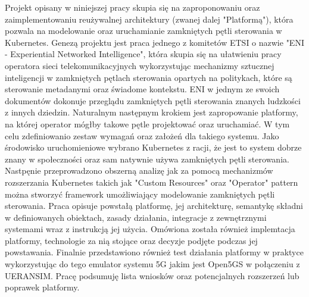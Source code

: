 Projekt opisany w niniejszej pracy skupia się na zaproponowaniu oraz zaimplementowaniu reużywalnej architektury (zwanej dalej "Platformą"), która pozwala na modelowanie oraz uruchamianie zamkniętych pętli sterowania w Kubernetes. Genezą projektu jest praca jednego z komitetów ETSI o nazwie "ENI - Experiential Networked Intelligence", która skupia się na ułatwieniu pracy operatora sieci telekomunikacyjnych wykorzystując mechanizmy sztucznej inteligencji w zamkniętych pętlach sterowania opartych na politykach, które są sterowanie metadanymi oraz świadome kontekstu. ENI w jednym ze swoich dokumentów dokonuje przeglądu zamkniętych pętli sterowania znanych ludzkości z innych dziedzin. Naturalnym następnym krokiem jest zapropowanie platformy, na której operator mógłby takowe pętle projektować oraz uruchamiać. W tym celu zdefiniowanio zestaw wymagań oraz założeń dla takiego systemu. Jako środowisko uruchomieniowe wybrano  Kubernetes z racji, że jest to system dobrze znany w społeczności oraz sam natywnie używa zamkniętych pętli sterowania. Nastpęnie przeprowadzono obszerną analizę jak za pomocą mechanizmów rozszerzania Kubernetes takich jak "Custom Resources" oraz "Operator" pattern można stworzyć framework umożliwiający modelowanie zamkniętych pętli sterowania. Praca opisuje powstałą platformę, jej architekturę, semantykę składni w definiowanych obiektach, zasady działania, integracje z zewnętrznymi systemami wraz z instrukcją jej użycia. Omówiona została również implemtacja platformy, technologie za nią stojące oraz decyzje podjęte podczas jej powstawania. Finalnie przedstawiono również test działania platformy w praktyce wykorzystując do tego emulator systemu 5G jakim jest Open5GS w połączeniu z UERANSIM. Pracę podsumuję lista wniosków oraz potencjalnych rozszerzeń lub poprawek platformy. 